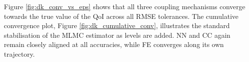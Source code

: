 Figure \ref{fig:dk_conv_vs_eps} shows that all three coupling mechanisms 
converge towards the true value of 
the QoI across all RMSE tolerances. The cumulative convergence plot, 
Figure \ref{fig:dk_cumulative_conv}, illustrates the standard stabilisation 
of the MLMC estimator as levels are added. NN and CC 
again remain closely aligned at all accuracies, while FE 
converges along its own trajectory.
